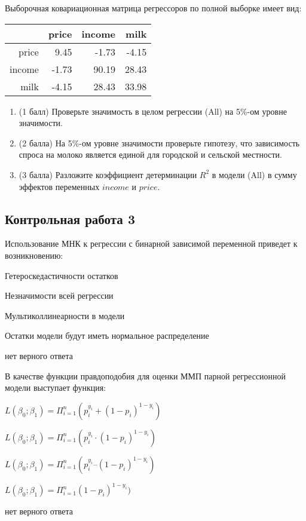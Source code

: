 \begin{enumerate}
Выборочная ковариационная матрица регрессоров по полной выборке имеет вид:

\begin{tabular}{rrrr}
  \hline
 & price & income & milk \\ 
  \hline
price & 9.45 & -1.73 & -4.15 \\ 
  income & -1.73 & 90.19 & 28.43 \\ 
  milk & -4.15 & 28.43 & 33.98 \\ 
   \hline
\end{tabular}



\begin{enumerate}
\item (1 балл) Проверьте значимость в целом регрессии (All) на 5\%-ом уровне значимости.
\item (2 балла) На 5\%-ом уровне значимости проверьте гипотезу, что зависимость спроса на молоко является единой для городской и сельской местности.
\item (3 балла) Разложите коэффициент детерминации $R^2$ в модели (All) в сумму эффектов переменных $income$ и $price$.
\end{enumerate}



\end{enumerate}

\subsection{Контрольная работа 3}

\begin{question}
  Использование МНК к регрессии с бинарной зависимой переменной приведет к возникновению:
\begin{answerlist}
  \item Гетероскедастичности остатков
  \item Незначимости всей регрессии
  \item Мультиколлинеарности в модели
  \item Остатки модели будут иметь нормальное распределение  
  \item нет верного ответа
\end{answerlist}
\end{question}


\begin{question}
  В качестве функции правдоподобия для оценки ММП парной регрессионной модели выступает функция:
\begin{answerlist}[2]
  \item \( L( \beta_0 ;\beta_1)= \Pi_{i=1}^{n}{(p_{i}^{y_i}+(1-p_i)^{1-y_i})} \)
  \item \( L( \beta_0 ;\beta_1)= \Pi_{i=1}^{n}{(p_{i}^{y_i} \cdot (1-p_i)^{1-y_i})} \)
  \item \( L( \beta_0 ;\beta_1) = \Pi_{i=1}^{n}{(p_{i}^{y_i} – (1-p_i)^{1-y_i})} \)
  \item\( L( \beta_0 ;\beta_1) = \Pi_{i=1}^{n}{(1-p_i)^{1-y_i}}) \)
  \item нет верного ответа
\end{answerlist}
\end{question}



